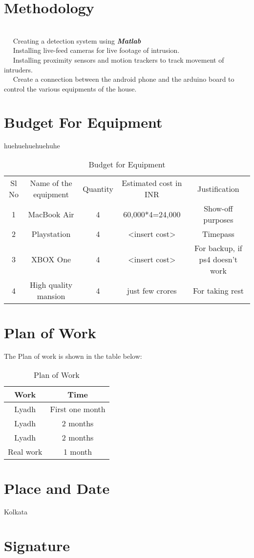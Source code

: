 \documentclass[margin, centered]{res}
\begin{document}
\begin{resume}
\section{Methodology}
\hspace{5mm} \\
~\textbullet~ Creating a detection system using \textbf{\textit{Matlab}}\\
~\textbullet~ Installing live-feed cameras for live footage of intrusion.\\
~\textbullet~ Installing proximity sensors and motion trackers to track movement of intruders.\\
~\textbullet~ Create a connection between the android phone and the arduino board to control the various equipments of the house.


\section{Budget For Equipment} huehuehuehuehuhe
\begin{table}[ht]
\caption{Budget for Equipment}
\begin{tabular}{c c c c c}
\hline \hline
Sl No & Name of the equipment & Quantity & Estimated cost in INR & Justification\\

1 & MacBook Air & 4 & 60,000*4=24,000 & Show-off purposes\\
2 & Playstation & 4 & <insert cost> & Timepass\\
3 & XBOX One & 4 & <insert cost> & For backup, if ps4 doesn't work\\
4 & High quality mansion & 4 & just few crores & For taking rest


\end{tabular}
\end{table}

\section{Plan of Work} The Plan of work is shown in the table below:

\begin{table}[ht]
\caption{Plan of Work}
\centering
\begin{tabular}{c c}
\hline \hline
Work & Time \\
\hline
Lyadh & First one month\\
Lyadh & 2 months\\
Lyadh & 2 months\\
Real work & 1 month\\

\end{tabular}
\end{table}

\section{Place and Date} Kolkata

\section{Signature}

\end{resume}
\end{document}
